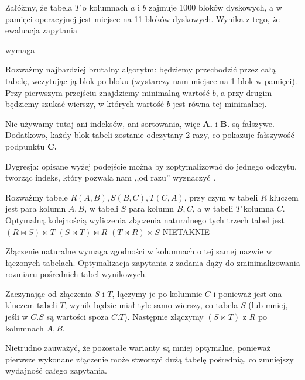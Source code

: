 \begin{solutions}
    \sol Załóżmy, że tabela $T$ o kolumnach $a$ i $b$ zajmuje 1000 bloków dyskowych, a w pamięci operacyjnej jest miejsce na 11 bloków dyskowych. Wynika z tego, że ewaluacja zapytania
    \begin{center}
    \end{center}
    wymaga

    Rozważmy najbardziej brutalny algorytm: będziemy przechodzić przez całą tabelę, wczytując ją blok po bloku (wystarczy nam miejsce na 1 blok w pamięci). Przy pierwszym przejściu znajdziemy minimalną wartość $b$, a przy drugim będziemy szukać wierszy, w których wartość $b$ jest równa tej minimalnej.
    
    Nie używamy tutaj ani indeksów, ani sortowania, więc \textbf{A.} i \textbf{B.} są fałszywe. Dodatkowo, każdy blok tabeli zostanie odczytany 2 razy, co pokazuje fałszywość podpunktu \textbf{C.}

    Dygresja: opisane wyżej podejście można by zoptymalizować do jednego odczytu, tworząc indeks, który pozwala nam ,,od razu'' wyznaczyć .

    \sol Rozważmy tabele $R(A, B), S(B, C), T(C, A)$, przy czym w tabeli $R$ kluczem jest para kolumn $A, B$, w tabeli $S$ para kolumn $B, C$, a w tabeli $T$ kolumna $C$. Optymalną kolejnością wyliczenia złączenia naturalnego tych trzech tabel jest
    \answerss
    {$(R \bowtie S) \bowtie T$}
    {$(S \bowtie T) \bowtie R$}
    {$(T \bowtie R) \bowtie S$}
    {NIE}{TAK}{NIE}

    Złączenie naturalne wymaga zgodności w kolumnach o tej samej nazwie w łączonych tabelach. Optymalizacja zapytania z zadania dąży do zminimalizowania rozmiaru pośrednich tabel wynikowych.

    Zaczynając od złączenia $S$ i $T$, łączymy je po kolumnie $C$ i ponieważ jest ona kluczem tabeli $T$, wynik będzie miał tyle samo wierszy, co tabela $S$ (lub mniej, jeśli w $C.S$ są wartości spoza $C.T$). Następnie złączymy $(S \bowtie T)$ z $R$ po kolumnach $A, B$.

    Nietrudno zauważyć, że pozostałe warianty są mniej optymalne, ponieważ pierwsze wykonane złączenie może stworzyć dużą tabelę pośrednią, co zmniejszy wydajność całego zapytania.
\end{solutions}